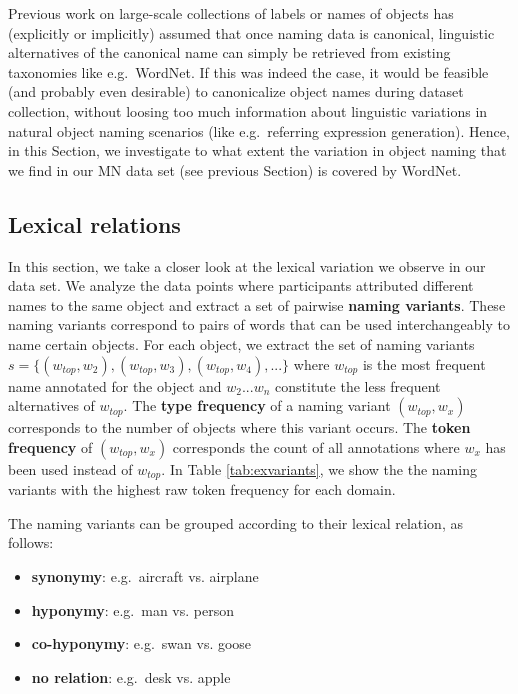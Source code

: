 
Previous work on large-scale collections of labels or names of objects has (explicitly or implicitly) assumed that once naming data is canonical, linguistic alternatives of the canonical name can simply be retrieved from existing taxonomies like e.g.\ WordNet. 
If this was indeed the case, it would be feasible (and probably even desirable) to canonicalize object names during dataset collection, without loosing too much information about linguistic variations in natural object naming scenarios (like e.g.\ referring expression generation).
Hence, in this Section, we investigate to what extent the variation in object naming that we find in our MN data set (see previous Section) is covered by WordNet.

\subsection{Lexical relations}

In this section, we take a closer look at the lexical variation we observe in our data set. We analyze the data points where participants attributed different names to the same object and extract a set of  pairwise \textbf{naming variants}. These naming variants correspond to pairs of words that can be used interchangeably to name certain objects.
For each object, we extract the set of naming variants $s = \{ (w_{top},w_2), (w_{top},w_3), (w_{top},w_4),... \}$  where $w_{top}$ is the most frequent name annotated for the object and $w_2 ... w_n$ constitute the less frequent alternatives of $w_{top}$.  The  \textbf{type frequency} of a naming variant $(w_{top},w_x)$ corresponds to the number of objects where this variant occurs. The \textbf{token frequency} of $(w_{top},w_x)$ corresponds the count of all annotations where $w_x$ has been used instead of $w_{top}$.
In Table \ref{tab:exvariants}, we show the the naming variants with the highest raw token frequency for each domain. 

The naming variants can be grouped according to their lexical relation, as follows:

\begin{itemize}
\item \textbf{synonymy}: e.g.\ aircraft vs. airplane 
\item \textbf{hyponymy}: e.g.\ man vs. person
\item \textbf{co-hyponymy}: e.g.\ swan vs. goose
\item \textbf{no relation}: e.g.\  desk vs. apple
\end{itemize}

